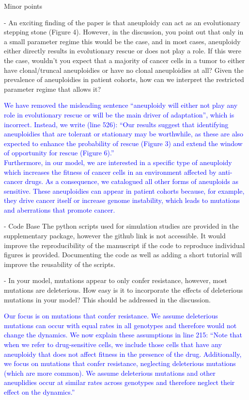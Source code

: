 \documentclass[12pt]{extarticle}
\begin{document}
Minor points

- An exciting finding of the paper is that aneuploidy can act as an evolutionary stepping stone (Figure 4). However, in the discussion, you point out that only in a small parameter regime this would be the case, and in most cases, aneuploidy either directly results in evolutionary rescue or does not play a role. If this were the case, wouldn't you expect that a majority of cancer cells in a tumor to either have clonal/truncal aneuploidies or have no clonal aneuploidies at all? Given the prevalence of aneuploidies in patient cohorts, how can we interpret the restricted parameter regime that allows it?

\textcolor{blue}{
We have removed the misleading sentence ``aneuploidy will either not play any role in evolutionary rescue or will be the main driver of adaptation'', which is incorrect. Instead, we write (line 526): ``Our results suggest that identifying aneuploidies that are tolerant or stationary may be worthwhile, as these are also expected to enhance the probability of rescue (Figure 3) and extend the window of opportunity for rescue (Figure 6).''\\
Furthermore, in our model, we are interested in a specific type of aneuploidy which increases the fitness of cancer cells in an environment affected by anti-cancer drugs. As a consequence, we catalogued all other forms of aneuploids as sensitive. These aneuploidies can appear in patient cohorts because, for example, they drive cancer itself or increase genome instability, which leads to mutations and aberrations that promote cancer.
} 

- Code Base
The python scripts used for simulation studies are provided in the supplementary package, however the github link is not accessible.
It would improve the reproducibility of the manuscript if the code to reproduce individual figures is provided.
Documenting the code as well as adding a short tutorial will improve the reusability of the scripts.

- In your model, mutations appear to only confer resistance, however, most mutations are deleterious. How easy is it to incorporate the effects of deleterious mutations in your model? This should be addressed in the discussion.

\textcolor{blue}{Our focus is on mutations that confer resistance. We assume deleterious mutations can occur with equal rates in all genotypes and therefore would not change the dynamics. We now explain these assumptions in line 215: ``Note that when we refer to drug-sensitive cells, we include those cells that have any aneuploidy that does not affect fitness in the presence of the drug. Additionally, we focus on mutations that confer resistance, neglecting deleterious mutations (which are more common). We assume deleterious mutations and other aneuplidies occur at similar rates across genotypes and therefore neglect their effect on the dynamics.''
} 
\end{document}
